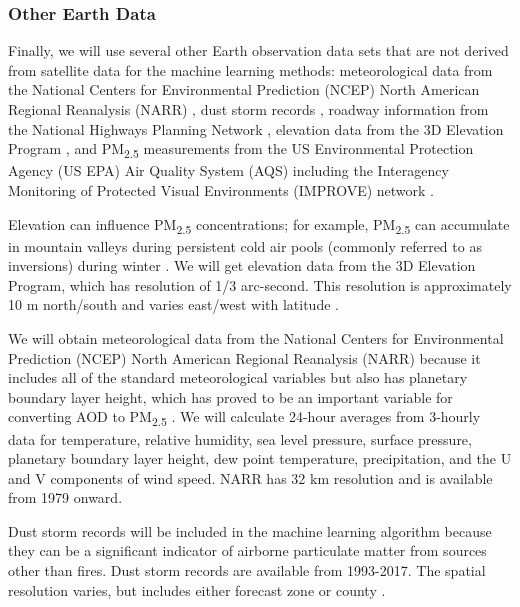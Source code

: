 \documentclass[authoryear]{elsarticle}
\begin{document}
\subsubsection{Other Earth Data} %

Finally, we will use several other Earth observation data sets that are not derived from satellite data for the machine learning methods: 
meteorological data from the National Centers for Environmental Prediction (NCEP) North American Regional Reanalysis (NARR) \citep{Mesinger2006,NCEPReanalysis2005}, dust storm records \citep{NWSstorms2017}, roadway information from the National Highways Planning Network \citep{NHP2017}, elevation data from the 3D Elevation Program \citep{USGSElevation2017}, and PM\textsubscript{2.5} measurements from the US Environmental Protection Agency (US EPA) Air Quality System (AQS) \citep{EPAAirData2017} including the Interagency Monitoring of Protected Visual Environments (IMPROVE) network \citep{EPANPM25IMPROVE2017}.

Elevation can influence PM\textsubscript{2.5} concentrations; for example, PM\textsubscript{2.5} can accumulate in mountain valleys during persistent cold air pools 
(commonly referred to as inversions) 
during winter \citep{Whiteman2014}. We will get elevation data from the 3D Elevation Program, which has resolution of 1/3 arc-second. This resolution is approximately 10 m north/south and varies east/west with latitude \citep{USGSElevation2017}.

We will obtain meteorological data from the National Centers for Environmental Prediction (NCEP) North American Regional Reanalysis (NARR) \citep{Mesinger2006,NCEPReanalysis2005} because it includes all of the standard meteorological variables but also has planetary boundary layer height, which has proved to be an important variable for converting AOD to PM\textsubscript{2.5} \citep{liu_estimating_2005}. We will calculate 24-hour averages from 3-hourly data for temperature, relative humidity, sea level pressure, surface pressure, planetary boundary layer height, dew point temperature, precipitation, and the U and V components of wind speed. NARR has 32 km resolution and is available from 1979 onward.  

Dust storm records will be included in the machine learning algorithm because they can be a significant indicator of airborne particulate matter from sources other than fires. Dust storm records are available from 1993-2017. The spatial resolution varies, but includes either forecast zone or county  \citep{NWSstorms2017,NWSrecordhistory2017,NWSInstructions2016}.
\end{document}
